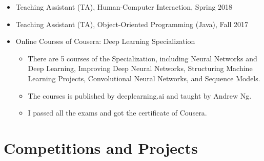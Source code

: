 \documentclass[letterpaper]{twentysecondcv} %
\begin{document}
\begin{CJK*}{UTF8}{gbsn}
\begin{itemize}
	\item Teaching Assistant (TA), Human-Computer Interaction, Spring 2018
	\item Teaching Assistant (TA), Object-Oriented Programming (Java), Fall 2017
	\item Online Courses of Cousera: Deep Learning Specialization
		\begin{itemize}
			\item There are 5 courses of the Specialization, including 
				Neural Networks and Deep Learning, Improving Deep Neural Networks, 
				Structuring Machine Learning Projects, Convolutional Neural Networks, 
				and Sequence Models.
			\item The courses is published by deeplearning.ai and taught by Andrew Ng.
			\item I passed all the exams and got the certificate of Cousera.
		\end{itemize}
\end{itemize}


\section{Competitions and Projects}


\end{CJK*}
\end{document}
